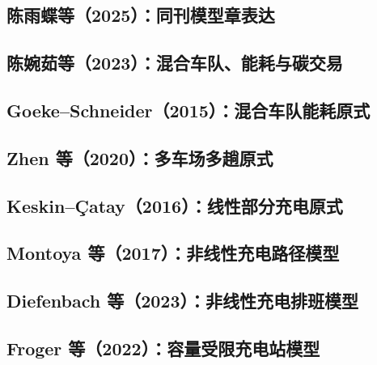 \documentclass[UTF8,11pt,a4paper,fontset=none]{ctexart}
\begin{document}
\subsection{陈雨蝶等（2025）：同刊模型章表达}


\subsection{陈婉茹等（2023）：混合车队、能耗与碳交易}


\subsection{Goeke--Schneider（2015）：混合车队能耗原式}


\subsection{Zhen 等（2020）：多车场多趟原式}


\subsection{Keskin--Çatay（2016）：线性部分充电原式}


\subsection{Montoya 等（2017）：非线性充电路径模型}


\subsection{Diefenbach 等（2023）：非线性充电排班模型}


\subsection{Froger 等（2022）：容量受限充电站模型}

\end{document}
